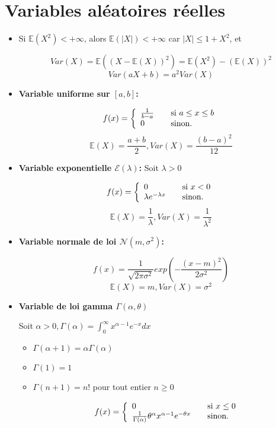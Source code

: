 \documentclass[10pt,a4paper,oneside]{article}
\begin{document}
\section{Variables aléatoires réelles}

\begin{itemize}
\item
Si $\mathbb{E}(X^2) < +\infty$, alors $\mathbb{E}(|X|) < +\infty$ car $|X| \leq 1 + X^2$, et

\[ Var(X) = \mathbb{E}((X - \mathbb{E}(X))^2) = \mathbb{E}(X^2) - (\mathbb{E}(X))^2 \]
\[ Var(aX + b) = a^2Var(X) \]

\item
\textbf{Variable uniforme sur $[a,b]$:}

\[ f(x) = \left\{ 
  \begin{array}{l l }
    \frac{1}{b - a} & \quad \text{si }a \leq x \leq b\\
    0 & \quad \text{sinon.}
  \end{array} \right.\]
\[ \mathbb{E}(X) = \frac{a + b}{2}, Var(X) = \frac{(b - a)^2}{12} \]

\item
\textbf{Variable exponentielle $\mathcal{E}(\lambda)$:} Soit $\lambda > 0$

\[ f(x) = \left\{ 
  \begin{array}{l l }
    0 & \quad \text{si }x < 0\\
    \lambda e^{-\lambda x} & \quad \text{sinon.}
  \end{array} \right.\]
\[ \mathbb{E}(X) = \frac{1}{\lambda}, Var(X) = \frac{1}{\lambda^2} \]

\item
\textbf{Variable normale de loi $\mathcal{N}(m,\sigma^2)$:}

\[ f(x) = \frac{1}{\sqrt{2 \pi \sigma^2}} exp(-\frac{(x - m)^2}{2 \sigma^2}) \]
\[ \mathbb{E}(X) = m, Var(X) = \sigma^2 \]

\item
\textbf{Variable de loi gamma $\Gamma(\alpha, \theta)$}

Soit $\alpha > 0, \Gamma(\alpha) = \int_{0}^{\infty} x^{\alpha - 1}e^{-x} dx$

\begin{itemize}
\item
$\Gamma(\alpha + 1) = \alpha \Gamma(\alpha)$
\item
$\Gamma(1) = 1$
\item
$\Gamma(n + 1) = n!$ pour tout entier $n \geq 0$

\[ f(x) = \left\{ 
  \begin{array}{l l }
    0 & \quad \text{si }x \leq 0\\
    \frac{1}{\Gamma(\alpha)} \theta^\alpha x^{\alpha - 1} e^{-\theta x} & \quad \text{sinon.}
  \end{array} \right.\]


\end{itemize}
\end{itemize}
\end{document}
